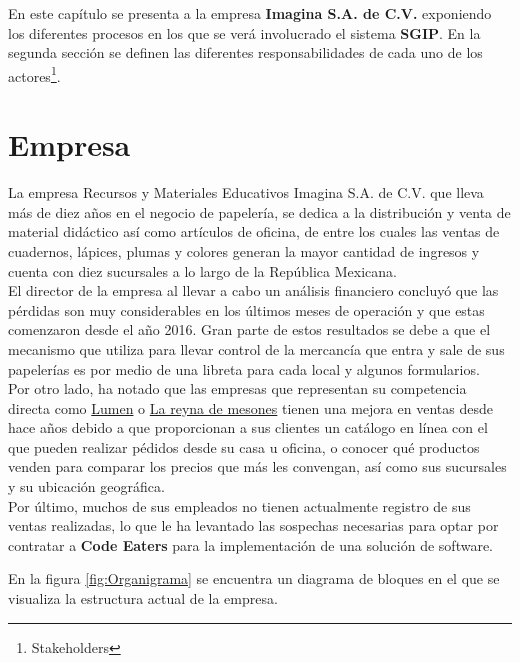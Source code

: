 En este capítulo se presenta a la empresa \textbf{Imagina S.A. de C.V.} exponiendo los diferentes procesos en los que se verá involucrado el sistema \textbf{SGIP}. En la segunda sección se definen las diferentes responsabilidades de cada uno de los actores\footnote{Stakeholders}.


\section{Empresa}

La empresa Recursos y Materiales Educativos Imagina S.A. de C.V.  que lleva más de diez años en el negocio de papelería, se dedica a la distribución y venta de material didáctico así como artículos de oficina,  de entre los cuales las ventas de cuadernos, lápices, plumas y colores generan la mayor cantidad de ingresos y cuenta con diez sucursales a lo largo de la República Mexicana.\\

El director de la empresa al llevar a cabo un análisis financiero concluyó que las pérdidas son muy considerables en los últimos meses de operación y que estas comenzaron desde el año 2016. Gran parte de estos resultados se debe a que el mecanismo que utiliza para llevar control de la mercancía que entra y sale de sus papelerías es por medio de una libreta para cada local y algunos formularios.\\

Por otro lado,  ha notado que las empresas que representan su competencia directa como \href{https://www.lumen.com.mx/}{Lumen} o \href{http://www.lareynademesones.com.mx/}{La reyna de mesones} tienen una mejora en ventas desde hace años debido a que proporcionan a sus clientes un catálogo en línea con el que pueden realizar pédidos desde su casa u oficina, o conocer qué productos venden para comparar los precios que más les convengan, así como sus sucursales y su  ubicación geográfica.\\

Por último, muchos de sus empleados no tienen actualmente registro de sus ventas realizadas, lo que le ha levantado las sospechas necesarias para optar por contratar a \textbf{Code Eaters} para la implementación de una solución de software.

En la figura \ref{fig:Organigrama} se encuentra un diagrama de bloques en el que se visualiza la estructura actual de la empresa.

